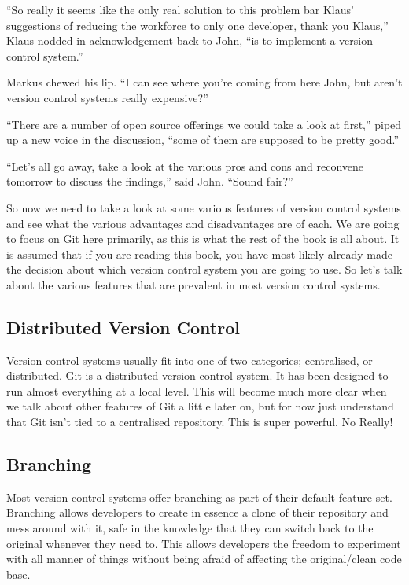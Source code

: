 \begin{trenches}
``So really it seems like the only real solution to this problem bar Klaus' suggestions of reducing the workforce to only one developer, thank you Klaus,'' Klaus nodded in acknowledgement back to John, ``is to implement a version control system.''

Markus chewed his lip.
``I can see where you're coming from here John, but aren't version control systems really expensive?''

``There are a number of open source offerings we could take a look at first,'' piped up a new voice in the discussion, ``some of them are supposed to be pretty good.''

``Let's all go away, take a look at the various pros and cons and reconvene tomorrow to discuss the findings,'' said John.
``Sound fair?''
\end{trenches}

So now we need to take a look at some various features of version control systems and see what the various advantages and disadvantages are of each.
We are going to focus on Git here primarily, as this is what the rest of the book is all about.
It is assumed that if you are reading this book, you have most likely already made the decision about which version control system you are going to use.
So let's talk about the various features that are prevalent in most version control systems.

\subsection{Distributed Version Control}

Version control systems usually fit into one of two categories; centralised, or distributed.
Git is a distributed version control system.
It has been designed to run almost everything at a local level.
This will become much more clear when we talk about other features of Git a little later on, but for now just understand that Git isn't tied to a centralised repository.
This is super powerful.
No Really!

\subsection{Branching}

Most version control systems offer branching as part of their default feature set.
Branching allows developers to create in essence a clone of their repository and mess around with it, safe in the knowledge that they can switch back to the original whenever they need to.
This allows developers the freedom to experiment with all manner of things without being afraid of affecting the original/clean code base.

